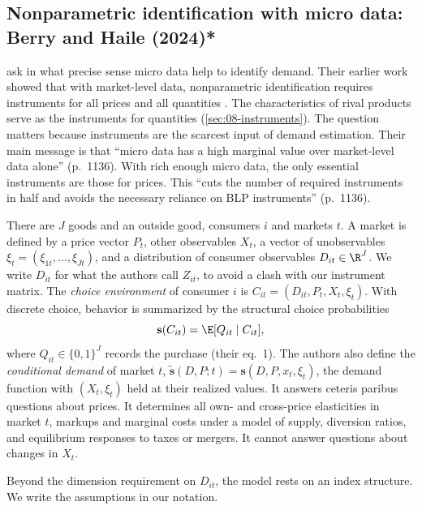 \subsection{Nonparametric identification with micro data: Berry and Haile (2024)*}\label{sec:08-bh24}

\citet{BerryHaile2024} ask in what precise sense micro data help to identify demand. Their earlier work showed that with
market-level data, nonparametric identification requires instruments for all prices and all quantities
\citep{BerryHaile2014}. The characteristics of rival products serve as the instruments for quantities
(\cref{sec:08-instruments}). The question matters because instruments are the scarcest input of demand estimation.
Their main message is that ``micro data has a high marginal value over market-level data alone'' (p.~1136). With rich
enough micro data, the only essential instruments are those for prices. This ``cuts the number of required instruments
in half and avoids the necessary reliance on BLP instruments'' (p.~1136).

There are $J$ goods and an outside good, consumers $i$ and markets $t$. A market is defined by a price vector $P_t$,
other observables $X_t$, a vector of unobservables $\xi_t = (\xi_{1t}, \dots, \xi_{Jt})$, and a distribution of
consumer observables $D_{it} \in \R^J$. We write $D_{it}$ for what the authors call $Z_{it}$, to avoid a clash with our
instrument matrix. The \emph{choice environment} of consumer $i$ is $C_{it} = (D_{it}, P_t, X_t, \xi_t)$. With discrete
choice, behavior is summarized by the structural choice probabilities
\begin{equation}\label{eq:08-bh-demand}
  \mathbf{s}(C_{it}) = \E[Q_{it} \mid C_{it}],
\end{equation}
where $Q_{it} \in \{0, 1\}^J$ records the purchase (their eq.~1). The authors also define the \emph{conditional demand}
of market $t$, $\tilde{\mathbf{s}}(D, P; t) = \mathbf{s}(D, P, x_t, \xi_t)$, the demand function with $(X_t, \xi_t)$
held at their realized values. It answers ceteris paribus questions about prices. It determines all own- and
cross-price elasticities in market $t$, markups and marginal costs under a model of supply, diversion ratios, and
equilibrium responses to taxes or mergers. It cannot answer questions about changes in $X_t$.

Beyond the dimension requirement on $D_{it}$, the model rests on an index structure. We write the assumptions in our
notation.

